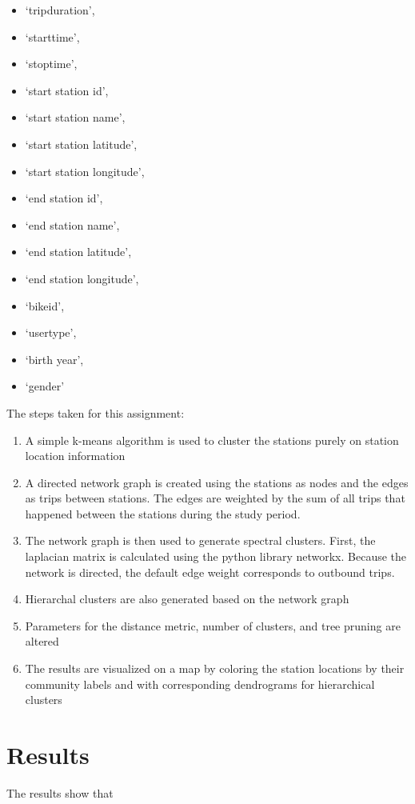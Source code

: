 \documentclass[10pt,twocolumn]{article}
\begin{document}
\begin{itemize}
\item `tripduration',
\item `starttime',
\item `stoptime',
\item `start station id',
\item `start station name',
\item `start station latitude',
\item `start station longitude',
\item `end station id',
\item `end station name',
\item `end station latitude',
\item `end station longitude',
\item `bikeid',
\item `usertype',
\item `birth year',
\item `gender'
\end{itemize}

The steps taken for this assignment:

\begin{enumerate}
\item A simple k-means algorithm is used to cluster the stations purely on station
location information
\item A directed network graph is created using the stations as nodes and the edges as trips
between stations. The edges are weighted by the sum of all trips that happened
between the stations during the study period.
\item The network graph is then used to generate spectral clusters. First, the
laplacian matrix is calculated using the python library networkx. Because the network
is directed, the default edge weight corresponds to outbound trips.
\item Hierarchal clusters are also generated based on the network graph
\item Parameters for the distance metric, number of clusters, and tree pruning are altered
\item The results are visualized on a map by coloring the station locations by their
community labels and with corresponding dendrograms for hierarchical clusters
\end{enumerate}

\section{Results}
The results show that
\end{document}
